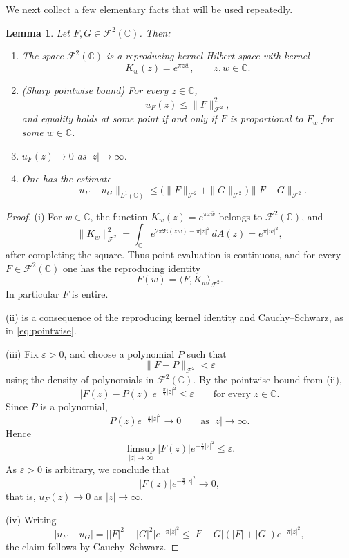 \documentclass[a4paper,11pt,reqno]{amsart}
\numberwithin{equation}{section}
\theoremstyle{plain} %
\newtheorem{lemma}{Lemma}[section]
\theoremstyle{definition} %
\theoremstyle{remark}
\newcommand{\C}{\mathbb{C}}
\begin{document}
We next collect a few elementary facts that will be used repeatedly.

\begin{lemma}\label{lem:Fock-basic}
Let $F,G \in \mathcal{F}^2(\mathbb{C})$. Then:
\begin{enumerate}
\item[(i)] The space $\mathcal{F}^2(\mathbb{C})$ is a reproducing kernel Hilbert space with kernel
\[
K_w(z) = e^{\pi z \overline{w}}, \qquad z,w \in \mathbb{C}.
\]

\item[(ii)] (Sharp pointwise bound) For every $z \in \mathbb{C}$,
\begin{equation}\label{eq:pointwise}
u_F(z) \le \|F\|_{\mathcal{F}^2}^2,
\end{equation}
and equality holds at some point if and only if $F$ is proportional to $F_w$
for some $w \in \mathbb{C}$.

\item[(iii)] $u_F(z) \to 0$ as $|z| \to \infty$.

\item[(iv)] One has the estimate
\[
\|u_F - u_G\|_{L^1(\mathbb{C})}
\le \big( \|F\|_{\mathcal{F}^2} + \|G\|_{\mathcal{F}^2} \big)
\|F - G\|_{\mathcal{F}^2}.
\]
\end{enumerate}
\end{lemma}

\begin{proof}
(i) For \(w\in \C\), the function \(K_w(z)=e^{\pi z\overline w}\) belongs to
\(\mathcal F^2(\C)\), and
\[
\|K_w\|_{\mathcal F^2}^2
=
\int_{\C} e^{2\pi \Re(z\overline w)-\pi |z|^2}\,dA(z)
=
e^{\pi |w|^2},
\]
after completing the square. Thus point evaluation is continuous, and for every
\(F\in \mathcal F^2(\C)\) one has the reproducing identity
\[
F(w)=\langle F,K_w\rangle_{\mathcal F^2}.
\]
In particular \(F\) is entire.

(ii) is a consequence of the reproducing kernel identity and Cauchy--Schwarz,
as in \eqref{eq:pointwise}.

(iii) Fix \(\varepsilon>0\), and choose a polynomial \(P\) such that
\[
\|F-P\|_{\mathcal F^2}<\varepsilon
\]
using the density of polynomials in \(\mathcal F^2(\C)\). By the pointwise bound from (ii),
\[
|F(z)-P(z)|e^{-\frac{\pi}{2}|z|^2}\le \varepsilon
\qquad\text{for every }z\in \C.
\]
Since \(P\) is a polynomial,
\[
P(z)e^{-\frac{\pi}{2}|z|^2}\to 0
\qquad\text{as }|z|\to\infty.
\]
Hence
\[
\limsup_{|z|\to\infty}|F(z)|e^{-\frac{\pi}{2}|z|^2}\le \varepsilon.
\]
As \(\varepsilon>0\) is arbitrary, we conclude that
\[
|F(z)|e^{-\frac{\pi}{2}|z|^2}\to 0,
\]
that is, \(u_F(z)\to 0\) as \(|z|\to\infty\).

(iv) Writing
\[
|u_F - u_G|
= \big||F|^2 - |G|^2\big| e^{-\pi|z|^2}
\le |F-G|(|F|+|G|) e^{-\pi|z|^2},
\]
the claim follows by Cauchy--Schwarz.
\end{proof}
\end{document}
